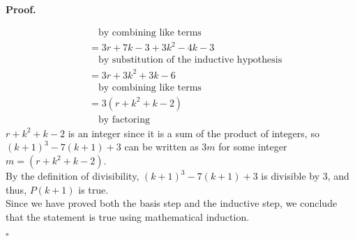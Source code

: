 \documentclass{article}
\newenvironment{proof}{
    \begin{mdframed}[nobreak=false, innerleftmargin=10pt, innerrightmargin=10pt, innertopmargin=10pt, innerbottommargin=10pt]
    \textbf{Proof.}
}{
    \hfill $\square$
    \end{mdframed}
}
\begin{document}
\begin{proof}
\begin{align*}
            & \quad \text{by combining like terms} \\
            &= 3r + 7k - 3 + 3k^2 - 4k -3 \\
            & \quad \text{by substitution of the inductive hypothesis} \\
            &= 3r + 3k^2 + 3k - 6 \\
            & \quad \text{by combining like terms} \\
            &= 3(r + k^2 + k - 2) \\
            & \quad \text{by factoring}
        \end{align*}
        $r + k^2 + k - 2$ is an integer since it is a sum of the product of integers, so $(k+1)^3 -7(k+1) +3$ can be written as $3m$ for some integer $m = (r + k^2 + k - 2)$. \\
        By the definition of divisibility, $(k+1)^3 -7(k+1) +3$ is divisible by $3$, and thus, $P(k+1)$ is true. \\
        Since we have proved both the basis step and the inductive step, we conclude that the statement is true using mathematical induction.
    \end{proof}
\end{document}
